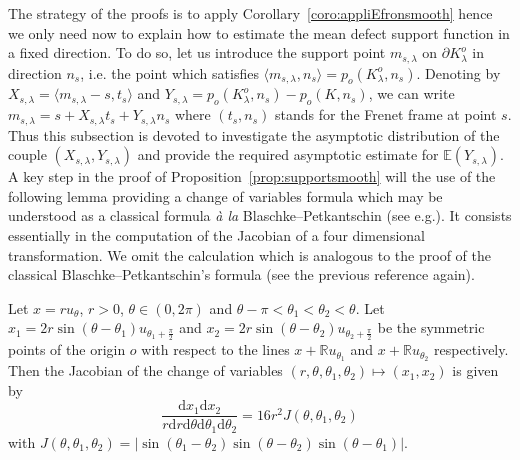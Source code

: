 \documentclass[AHL,Unicode,longabstracts,published]{cedram}
\newcommand{\dd}{\mathrm{d}}
\newcommand{\E}{\mathbb{E}}
\newcommand{\R}{\mathbb{R}}
\newcommand{\pass}{\vspace{0.3cm}\noindent}
\newcommand{\noi}{\noindent}
\newcommand{\R}{\mathbb{R}}
\begin{document}

The strategy of the proofs is to apply Corollary~\ref{coro:appliEfronsmooth} hence we only need now to explain how to estimate the mean defect support function in a fixed direction. To do so, let us introduce the support point $m_{s,\lambda}$ on $\partial K_{\lambda}^o$ in direction $n_s$, i.e. the point which satisfies $\langle m_{s,\lambda}, n_s\rangle=p_o(K_{\lambda}^o,n_s)$. Denoting by $X_{s,\lambda}=\langle m_{s,\lambda}-s,t_s\rangle$ and $Y_{s,\lambda}= p_o(K_{\lambda}^o,n_s)-p_o(K,n_s)$, we can write $m_{s,\lambda}=s+X_{s,\lambda}t_{s}+Y_{s,\lambda} n_s$ where $(t_s,n_s)$ stands for the Frenet frame at point $s$. Thus this subsection is devoted to investigate the asymptotic distribution of the couple $(X_{s,\lambda},Y_{s,\lambda})$ and provide the required asymptotic estimate for $\E(Y_{s,\lambda})$. A key step in the proof of Proposition~\ref{prop:supportsmooth} will the use of the following lemma providing a change of variables formula which may be understood as a classical formula \emph{à la} Blaschke--Petkantschin (see e.g.\cite[Theorem~7.3.1]{SW}). It consists essentially in the computation of the Jacobian of a four dimensional transformation. We omit the calculation which is analogous to the proof of the classical Blaschke--Petkantschin's formula (see the previous reference again).

\begin{lemm}\label{lem:jacob}
Let $x=r u_{\theta}$, $r>0$, $\theta\in (0,2\pi)$ and $\theta-\pi<\theta_1<\theta_2<\theta$. Let $x_1=2r\sin(\theta-\theta_1)u_{\theta_1+\frac{\pi}{2}}$ and $x_2=2r\sin(\theta-\theta_2)u_{\theta_2+\frac{\pi}{2}}$ be the symmetric points of the origin $o$ with respect to the lines $x+\R u_{\theta_1}$ and $x+\R u_{\theta_2}$ respectively. Then the Jacobian of the change of variables $(r,\theta,\theta_1,\theta_2)\longmapsto (x_1,x_2)$ is given by
\[
\frac{\dd x_1 \dd x_2}{r \dd r \dd \theta\dd \theta_1\dd \theta_2} = 16 r^2 J(\theta,\theta_1,\theta_2)
\]
with $J(\theta,\theta_1,\theta_2) = |\sin(\theta_1-\theta_2)\sin(\theta-\theta_2)\sin(\theta-\theta_1)|$.
\end{lemm}
\end{document}
